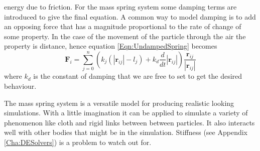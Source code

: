 energy due to friction. For the mass spring system some damping terms are
introduced to give the final equation. A common way to
model damping is to add an opposing force that has a magnitude proportional to
the rate of change of some property. In the case of the movement of the particle
through the air the property is distance, hence equation \ref{Eqn:UndampedSpring}
becomes
\begin{equation}
    \label{Eqn:DampedSpring}
      \mathbf{F}_i =
      \sum_{j=0}^{n}\left(k_j\left(\left|\mathbf{r}_{ij}\right|-l_j\right) 
                    + k_d\frac{d}{dt}\left|\mathbf{r}_{ij}\right|\right)
                    \frac{\mathbf{r}_{ij}}{\left|\mathbf{r}_{ij}\right|} 
\end{equation}
where $k_d$ is the constant of damping that we are free to set to get the
desired behaviour.

The mass spring system is a versatile model for producing realistic looking
simulations. With a little imagination it can be applied to simulate a variety
of phenomenon like cloth and rigid links between between particles. It
also interacts well with other bodies that might be in the simulation.
Stiffness (see Appendix \ref{Cha:DESolvers}) is a problem to watch out for.

